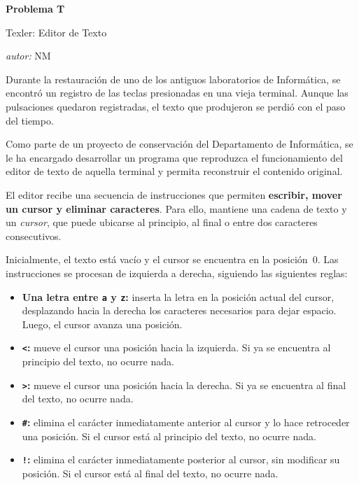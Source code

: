 \documentclass[11pt,letterpaper]{article}
\newcommand{\instruccion}[1]{\texttt{#1}}
\begin{document}
\thispagestyle{fancy}

\begin{center}
  {\huge \bf \sf Problema T}\par\vspace{0.28em}
  {\LARGE\sffamily Texler: Editor de Texto}\par\vspace{0.22em}
  \normalsize{{\em autor:} NM}
\end{center}
\vspace{0.95em}

Durante la restauración de uno de los antiguos laboratorios de Informática, se encontró un registro de las teclas presionadas en una vieja terminal. Aunque las pulsaciones quedaron registradas, el texto que produjeron se perdió con el paso del tiempo.

Como parte de un proyecto de conservación del Departamento de Informática, se le ha encargado desarrollar un programa que reproduzca el funcionamiento del editor de texto de aquella terminal y permita reconstruir el contenido original.

El editor recibe una secuencia de instrucciones que permiten \textbf{escribir, mover un cursor y eliminar caracteres}. Para ello, mantiene una cadena de texto y un \emph{cursor}, que puede ubicarse al principio, al final o entre dos caracteres consecutivos.

Inicialmente, el texto está vacío y el cursor se encuentra en la posición~0. Las instrucciones se procesan de izquierda a derecha, siguiendo las siguientes reglas:

\begin{itemize}
  \item[\textbullet] \textbf{Una letra entre \instruccion{a} y \instruccion{z}:} inserta la letra en la posición actual del cursor, desplazando hacia la derecha los caracteres necesarios para dejar espacio. Luego, el cursor avanza una posición.

  \item[\textbullet] \textbf{\instruccion{\textless}:} mueve el cursor una posición hacia la izquierda. Si ya se encuentra al principio del texto, no ocurre nada.

  \item[\textbullet] \textbf{\instruccion{\textgreater}:} mueve el cursor una posición hacia la derecha. Si ya se encuentra al final del texto, no ocurre nada.

  \item[\textbullet] \textbf{\instruccion{\#}:} elimina el carácter inmediatamente anterior al cursor y lo hace retroceder una posición. Si el cursor está al principio del texto, no ocurre nada.

  \item[\textbullet] \textbf{\instruccion{!}:} elimina el carácter inmediatamente posterior al cursor, sin modificar su posición. Si el cursor está al final del texto, no ocurre nada.
\end{itemize}
\end{document}
